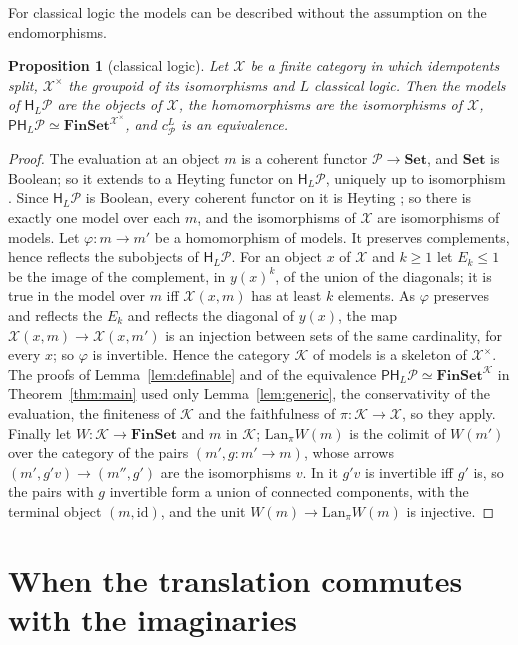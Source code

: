 \documentclass[11pt]{amsart}
\newtheorem{prop}[thm]{Proposition}
\theoremstyle{definition}
\newcommand{\Set}{\mathbf{Set}}
\newcommand{\Fin}{\mathbf{FinSet}}
\newcommand{\PP}{\mathsf P}
\newcommand{\HH}{\mathsf H}
\newcommand{\cX}{\mathcal X}
\newcommand{\cP}{\mathcal P}
\newcommand{\cK}{\mathcal K}
\newcommand{\id}{\mathrm{id}}
\begin{document}
For classical logic the models can be described without the assumption
on the endomorphisms.

\begin{prop}[classical logic]\label{prop:classical}
Let $\cX$ be a finite category in which idempotents split, $\cX^\times$
the groupoid of its isomorphisms and $L$ classical logic. Then the
models of $\HH_L\cP$ are the objects of $\cX$, the homomorphisms are
the isomorphisms of $\cX$, $\PP\HH_L\cP\simeq\Fin^{\cX^\times}$, and
$c^L_\cP$ is an equivalence.
\end{prop}
\begin{proof}
The evaluation at an object $m$ is a coherent functor $\cP\to\Set$, and
$\Set$ is Boolean; so it extends to a Heyting functor on $\HH_L\cP$,
uniquely up to isomorphism \cite[\S2]{Interm}. Since $\HH_L\cP$ is
Boolean, every coherent functor on it is Heyting
\cite[Lemma~2.1]{Heyting}; so there is exactly one model over each $m$,
and the isomorphisms of $\cX$ are isomorphisms of models. Let
$\varphi\colon m\to m'$ be a homomorphism of models. It preserves
complements, hence reflects the subobjects of $\HH_L\cP$. For an object
$x$ of $\cX$ and $k\ge1$ let $E_k\le1$ be the image of the complement,
in $y(x)^k$, of the union of the diagonals; it is true in the model
over $m$ iff $\cX(x,m)$ has at least $k$ elements. As $\varphi$
preserves and reflects the $E_k$ and reflects the diagonal of $y(x)$,
the map $\cX(x,m)\to\cX(x,m')$ is an injection between sets of the
same cardinality, for every $x$; so $\varphi$ is invertible. Hence the
category $\cK$ of models is a skeleton of $\cX^\times$. The proofs of
Lemma~\ref{lem:definable} and of the equivalence $\PP\HH_L\cP\simeq
\Fin^{\cK}$ in Theorem~\ref{thm:main} used only
Lemma~\ref{lem:generic}, the conservativity of the evaluation, the
finiteness of $\cK$ and the faithfulness of $\pi\colon\cK\to\cX$, so
they apply. Finally let $W\colon\cK\to\Fin$
and $m$ in $\cK$; $\mathrm{Lan}_\pi W(m)$ is the colimit of $W(m')$ over
the category of the pairs $(m',g\colon m'\to m)$, whose arrows
$(m',g'v)\to(m'',g')$ are the isomorphisms $v$. In it $g'v$ is
invertible iff $g'$ is, so the pairs with $g$ invertible form a union
of connected components, with the terminal object $(m,\id)$, and the
unit $W(m)\to\mathrm{Lan}_\pi W(m)$ is injective.
\end{proof}

\section{When the translation commutes with the imaginaries}
\end{document}
